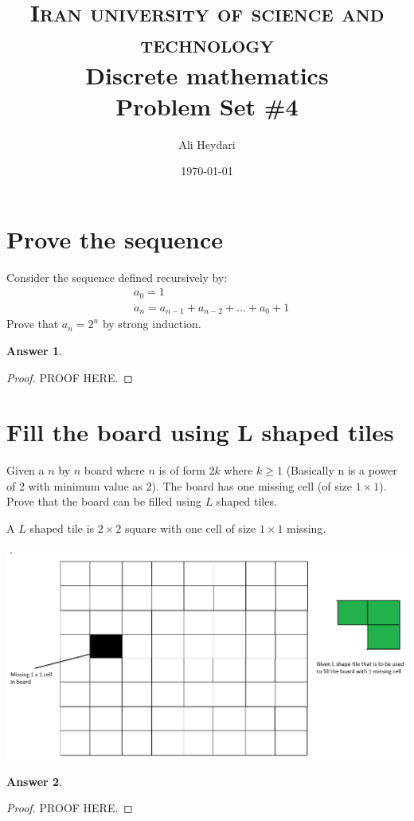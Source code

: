 \documentclass[a4paper]{article}
\title{
\textsc{Iran university of science and technology} \\ [25pt] %
Discrete mathematics\\Problem Set \#4 \\
}
\author{Ali Heydari}
\date{\today}
\renewcommand{\(}{\left(}
\renewcommand{\)}{\right)}
\theoremstyle{plain}
\theoremstyle{plain}
\theoremstyle{definition}
\newtheorem*{answer}{Answer}
\begin{document}
\maketitle

\section{Prove the sequence}
Consider the sequence defined recursively by:
\begin{align*}
   & a_0 = 1 \\
   & a_n = a_{n-1} + a_{n-2} + \dots + a_0 +1
\end{align*}
Prove that $a_n=2^n$ by strong induction.

\begin{shaded}
\begin{answer}
\begin{proof}
PROOF HERE.
\end{proof}
\end{answer}
\end{shaded}

\section{Fill the board using  L shaped tiles}
Given a $n$ by $n$ board where $n$ is of form $2k$ where $k \geq 1$ (Basically n is a power of 2 with minimum value as 2). The board has one missing cell (of size $1 \times 1$). Prove that the board can be filled using $L$ shaped tiles.

 A $L$ shaped tile is $2 \times 2$ square with one cell of size $1\times 1$ missing.

\includegraphics[scale = 0.2]{LShapes}

\begin{shaded}
\begin{answer}
\begin{proof}
PROOF HERE.
\end{proof}
\end{answer}
\end{shaded}
\end{document}
